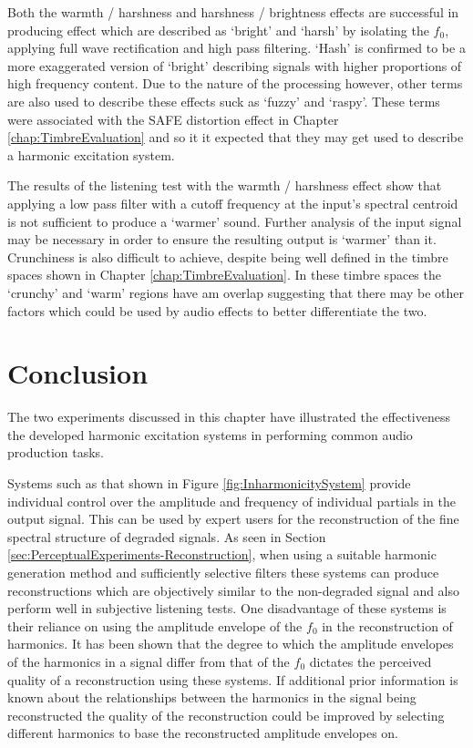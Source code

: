 		Both the warmth / harshness and harshness / brightness effects are successful in producing effect which are
		described as `bright' and `harsh' by isolating the $f_{0}$, applying full wave rectification and high pass
		filtering. `Hash' is confirmed to be a more exaggerated version of `bright' describing signals with higher
		proportions of high frequency content. Due to the nature of the processing however, other terms are also
		used to describe these effects suck as `fuzzy' and `raspy'. These terms were associated with the SAFE
		distortion effect in Chapter \ref{chap:TimbreEvaluation} and so it it expected that they may get used to
		describe a harmonic excitation system.

		The results of the listening test with the warmth / harshness effect show that applying a low pass filter
		with a cutoff frequency at the input's spectral centroid is not sufficient to produce a `warmer' sound.
		Further analysis of the input signal may be necessary in order to ensure the resulting output is `warmer'
		than it. Crunchiness is also difficult to achieve, despite being well defined in the timbre spaces shown in
		Chapter \ref{chap:TimbreEvaluation}. In these timbre spaces the `crunchy' and `warm' regions have am
		overlap suggesting that there may be other factors which could be used by audio effects to better
		differentiate the two.

\section{Conclusion}
\label{sec:PerceptualExperiments-Conclusion}
	The two experiments discussed in this chapter have illustrated the effectiveness the developed harmonic excitation
	systems in performing common audio production tasks. 
	
	Systems such as that shown in Figure \ref{fig:InharmonicitySystem} provide individual control over the amplitude
	and frequency of individual partials in the output signal. This can be used by expert users for the reconstruction
	of the fine spectral structure of degraded signals. As seen in Section
	\ref{sec:PerceptualExperiments-Reconstruction}, when using a suitable harmonic generation method and sufficiently
	selective filters these systems can produce reconstructions which are objectively similar to the non-degraded
	signal and also perform well in subjective listening tests. One disadvantage of these systems is their reliance on
	using the amplitude envelope of the $f_{0}$ in the reconstruction of harmonics. It has been shown that the degree
	to which the amplitude envelopes of the harmonics in a signal differ from that of the $f_{0}$ dictates the
	perceived quality of a reconstruction using these systems. If additional prior information is known about the
	relationships between the harmonics in the signal being reconstructed the quality of the reconstruction could be
	improved by selecting different harmonics to base the reconstructed amplitude envelopes on.

